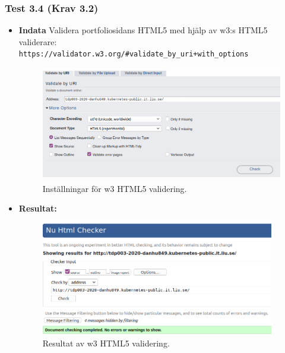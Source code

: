 \documentclass{TDP003mall}
\begin{document}
\subsubsection*{Test 3.4 (Krav 3.2)}
\begin{itemize}
\item[]\textbf{Indata} Validera portfoliosidans HTML5 med hjälp av w3:s HTML5 validerare:\\\texttt{https://validator.w3.org/\#validate\_by\_uri+with\_options}
  \begin{figure}[h!]
\centerline{\includegraphics[width=\textwidth, height=5cm]{../Pictures/HTML5_check.png}}
\caption{Inställningar för w3 HTML5 validering.\label{fig:}}
\end{figure}
\item[]\textbf{Resultat:}
    \begin{figure}[h!]
\centerline{\includegraphics[width=\textwidth, height=5cm]{../Pictures/HTML5_check_result.png}}
\caption{Resultat av w3 HTML5 validering.\label{fig:}}
\end{figure}
\end{itemize}
\end{document}
